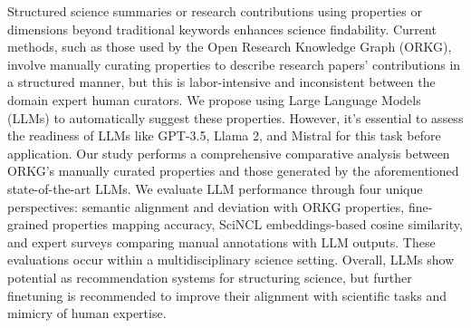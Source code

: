 Structured science summaries or research contributions using properties or dimensions beyond traditional keywords enhances science findability. Current methods, such as those used by the Open Research Knowledge Graph (ORKG), involve manually curating properties to describe research papers' contributions in a structured manner, but this is labor-intensive and inconsistent between the domain expert human curators. We propose using Large Language Models (LLMs) to automatically suggest these properties. However, it's essential to assess the readiness of LLMs like GPT-3.5, Llama 2, and Mistral for this task before application. Our study performs a comprehensive comparative analysis between ORKG's manually curated properties and those generated by the aforementioned state-of-the-art LLMs. We evaluate LLM performance through four unique perspectives: semantic alignment and deviation with ORKG properties, fine-grained properties mapping accuracy, SciNCL embeddings-based cosine similarity, and expert surveys comparing manual annotations with LLM outputs. These evaluations occur within a multidisciplinary science setting. Overall, LLMs show potential as recommendation systems for structuring science, but further finetuning is recommended to improve their alignment with scientific tasks and mimicry of human expertise.

